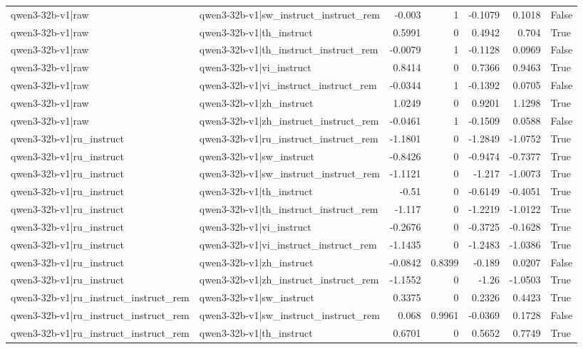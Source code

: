 \begin{table}
\begin{tabular}{l l r r r r l}
qwen3-32b-v1|raw & qwen3-32b-v1|sw_instruct_instruct_rem & -0.003 & 1 & -0.1079 & 0.1018 & False \\
qwen3-32b-v1|raw & qwen3-32b-v1|th_instruct & 0.5991 & 0 & 0.4942 & 0.704 & True \\
qwen3-32b-v1|raw & qwen3-32b-v1|th_instruct_instruct_rem & -0.0079 & 1 & -0.1128 & 0.0969 & False \\
qwen3-32b-v1|raw & qwen3-32b-v1|vi_instruct & 0.8414 & 0 & 0.7366 & 0.9463 & True \\
qwen3-32b-v1|raw & qwen3-32b-v1|vi_instruct_instruct_rem & -0.0344 & 1 & -0.1392 & 0.0705 & False \\
qwen3-32b-v1|raw & qwen3-32b-v1|zh_instruct & 1.0249 & 0 & 0.9201 & 1.1298 & True \\
qwen3-32b-v1|raw & qwen3-32b-v1|zh_instruct_instruct_rem & -0.0461 & 1 & -0.1509 & 0.0588 & False \\
qwen3-32b-v1|ru_instruct & qwen3-32b-v1|ru_instruct_instruct_rem & -1.1801 & 0 & -1.2849 & -1.0752 & True \\
qwen3-32b-v1|ru_instruct & qwen3-32b-v1|sw_instruct & -0.8426 & 0 & -0.9474 & -0.7377 & True \\
qwen3-32b-v1|ru_instruct & qwen3-32b-v1|sw_instruct_instruct_rem & -1.1121 & 0 & -1.217 & -1.0073 & True \\
qwen3-32b-v1|ru_instruct & qwen3-32b-v1|th_instruct & -0.51 & 0 & -0.6149 & -0.4051 & True \\
qwen3-32b-v1|ru_instruct & qwen3-32b-v1|th_instruct_instruct_rem & -1.117 & 0 & -1.2219 & -1.0122 & True \\
qwen3-32b-v1|ru_instruct & qwen3-32b-v1|vi_instruct & -0.2676 & 0 & -0.3725 & -0.1628 & True \\
qwen3-32b-v1|ru_instruct & qwen3-32b-v1|vi_instruct_instruct_rem & -1.1435 & 0 & -1.2483 & -1.0386 & True \\
qwen3-32b-v1|ru_instruct & qwen3-32b-v1|zh_instruct & -0.0842 & 0.8399 & -0.189 & 0.0207 & False \\
qwen3-32b-v1|ru_instruct & qwen3-32b-v1|zh_instruct_instruct_rem & -1.1552 & 0 & -1.26 & -1.0503 & True \\
qwen3-32b-v1|ru_instruct_instruct_rem & qwen3-32b-v1|sw_instruct & 0.3375 & 0 & 0.2326 & 0.4423 & True \\
qwen3-32b-v1|ru_instruct_instruct_rem & qwen3-32b-v1|sw_instruct_instruct_rem & 0.068 & 0.9961 & -0.0369 & 0.1728 & False \\
qwen3-32b-v1|ru_instruct_instruct_rem & qwen3-32b-v1|th_instruct & 0.6701 & 0 & 0.5652 & 0.7749 & True \\

\end{tabular}
\end{table}
